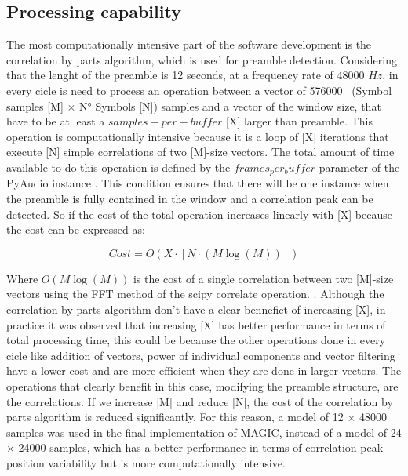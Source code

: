 \subsection{Processing capability}

The most computationally intensive part of the software development is the correlation by parts algorithm, which is used for preamble detection. Considering that the lenght of the preamble is 12 seconds, at a frequency rate of 48000 $Hz$, in every cicle is need to process an operation between a vector of 576000  (Symbol samples [M] $\times$ N° Symbols [N]) samples and a vector of the window size, that have to be at least a $samples-per-buffer$ [X] larger than preamble. This operation is computationally intensive because it is a loop of [X] iterations that execute [N] simple correlations of two [M]-size vectors. The total amount of time available to do this operation is defined by the $frames_per_buffer$ parameter of the PyAudio instance \cite{mitPyAudioDocumentation}. This condition ensures that there will be one instance when the preamble is fully contained in the window and a correlation peak can be detected. 
\newp
So if the cost of the total operation increases linearly with [X] because the cost can be expressed as:

\begin{equation}
    Cost = O(X \cdot [N \cdot (M\log(M))])
    \end{equation}

Where $O(M\log(M))$ is the cost of a single correlation between two [M]-size vectors using the FFT method of the scipy correlate operation. \cite{scipyCorrelatex2014}. Although the correlation by parts algorithm don't have a clear bennefict of increasing [X], in practice it was observed that increasing [X] has better performance in terms of total processing time, this could be because the other operations done in every cicle like addition of vectors, power of individual components and vector filtering have a lower cost and are more efficient when they are done in larger vectors. The operations that clearly benefit in this case, modifying the preamble structure, are the correlations. If we increase [M] and reduce [N], the cost of the correlation by parts algorithm is reduced significantly. For this reason, a model of 12 $\times$ 48000 samples was used in the final implementation of MAGIC, instead of a model of 24 $\times$ 24000 samples, which has a better performance in terms of correlation peak position variability but is more computationally intensive. 



